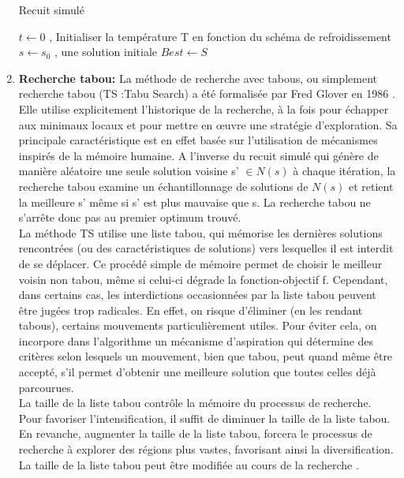 \begin{enumerate}[label=\alph*)]
\begin{algorithm}[H]
\caption{Recuit simulé }
\SetAlgoLined
\DontPrintSemicolon
$ t \gets 0 $ , Initialiser la température T en fonction du schéma de refroidissement \;
$ s\gets s_0 $ , une solution initiale \;
$ Best \gets S $ \;
\end{algorithm}


	\item \textbf{Recherche tabou: } La méthode de recherche avec tabous, ou simplement recherche tabou (TS :Tabu Search) a été formalisée par Fred Glover en 1986 \cite{glover1986future} . Elle utilise explicitement l’historique de la recherche, à la fois pour échapper aux minimaux locaux et pour mettre en œuvre une stratégie d’exploration. Sa principale caractéristique est en effet basée sur  l’utilisation de mécanismes inspirés de la mémoire humaine. A l'inverse du recuit simulé qui génère de manière aléatoire une seule solution voisine s’ \( \in N(s) \) à chaque itération, la recherche tabou examine un échantillonnage de solutions de \( N(s) \) et retient la meilleure s’ même si s’ est plus mauvaise que s. La recherche tabou ne s'arrête donc pas au premier optimum trouvé.\\
La méthode TS utilise une liste tabou, qui mémorise les dernières solutions rencontrées (ou des caractéristiques de solutions) vers lesquelles il est interdit de se déplacer. Ce procédé simple de mémoire permet de choisir le meilleur voisin non tabou, même si celui-ci dégrade la fonction-objectif f. Cependant, dans certains cas, les interdictions occasionnées par la liste tabou peuvent être jugées trop radicales. En effet, on risque d’éliminer (en les rendant tabous), certains mouvements particulièrement utiles. Pour éviter cela, on incorpore dans l’algorithme un mécanisme d’aspiration
qui détermine des critères selon lesquels un mouvement, bien que tabou, peut quand même être
accepté, s’il permet d’obtenir une meilleure solution que toutes celles déjà parcourues.\\
La taille de la liste tabou contrôle la mémoire du processus de recherche. Pour favoriser l’intensification, il suffit de diminuer la taille de la liste tabou. En revanche, augmenter la taille de la liste tabou, forcera le processus de recherche à explorer des régions plus vastes, favorisant ainsi la diversification. La taille de la liste tabou peut être modifiée au cours de la recherche \cite{battiti1994reactive}.\\

\end{enumerate}
